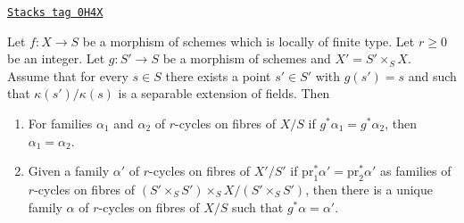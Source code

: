 \begin{lemma}
\label{relative-cycles-lemma-descend-family}
\href{https://stacks.math.columbia.edu/tag/0H4X}{\texttt{Stacks tag 0H4X}}

Let $f : X \to S$ be a morphism of schemes which is locally of finite type.
Let $r \geq 0$ be an integer. Let $g : S' \to S$ be a morphism of
schemes and $X' = S' \times_S X$. Assume that for every $s \in S$ there
exists a point $s' \in S'$ with $g(s') = s$ and such that
$\kappa(s')/\kappa(s)$ is a separable extension of fields. Then
\begin{enumerate}
\item For families $\alpha_1$ and $\alpha_2$ of $r$-cycles on fibres of $X/S$
if $g^*\alpha_1 = g^*\alpha_2$, then $\alpha_1 = \alpha_2$.
\item Given a family $\alpha'$ of $r$-cycles on fibres of $X'/S'$ if
$\text{pr}_1^*\alpha' = \text{pr}_2^*\alpha'$ as families of
$r$-cycles on fibres of $(S' \times_S S') \times_S X / (S' \times_S S')$,
then there is a unique family $\alpha$ of $r$-cycles on fibres of $X/S$
such that $g^*\alpha = \alpha'$.
\end{enumerate}
\end{lemma}

